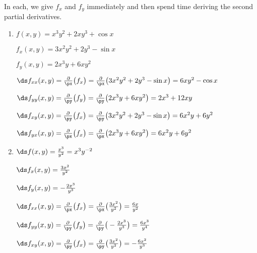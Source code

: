 

{In each, we give $f_x$ and $f_y$ immediately and then spend time deriving the second partial derivatives.
\begin{enumerate}
	\item $f(x,y) = x^3y^2+2xy^3+\cos x$
		
		$f_x(x,y) = 3x^2y^2+2y^3-\sin x$
		
		$f_y(x,y) = 2x^3y+6xy^2$
		
		$\ds f_{xx}(x,y) = \frac{\partial}{\px}\big(f_x\big) = \frac{\partial}{\px}\big(3x^2y^2+2y^3-\sin x\big) = 6xy^2-\cos x$
		
		$\ds f_{yy}(x,y) = \frac{\partial}{\py}\big(f_y\big) = \frac{\partial}{\py}\big(2x^3y+6xy^2\big) = 2x^3+12xy$
		
		$\ds f_{xy}(x,y) = \frac{\partial}{\py}\big(f_x\big) = \frac{\partial}{\py}\big(3x^2y^2+2y^3-\sin x\big) = 6x^2y+6y^2$
		
		$\ds f_{yx}(x,y) = \frac{\partial}{\px}\big(f_x\big) = \frac{\partial}{\px}\big(2x^3y+6xy^2\big) = 6x^2y+6y^2$

	\item		$\ds f(x,y) = \frac{x^3}{y^2} = x^3y^{-2}$
	
	$\ds f_x(x,y) = \frac{3x^2}{y^2}$
	
	$\ds f_y(x,y) = -\frac{2x^3}{y^3}$
	
	$\ds f_{xx}(x,y) = \frac{\partial}{\px}\big(f_x\big) = \frac{\partial}{\px}\big(\frac{3x^2}{y^2}\big) = \frac{6x}{y^2}$
		
		$\ds f_{yy}(x,y) = \frac{\partial}{\py}\big(f_y\big) = \frac{\partial}{\py}\big(-\frac{2x^3}{y^3}\big) = \frac{6x^3}{y^4}$
		
		$\ds f_{xy}(x,y) = \frac{\partial}{\py}\big(f_x\big) = \frac{\partial}{\py}\big(\frac{3x^2}{y^2}\big) = -\frac{6x^2}{y^3}$
		

\end{enumerate}}
